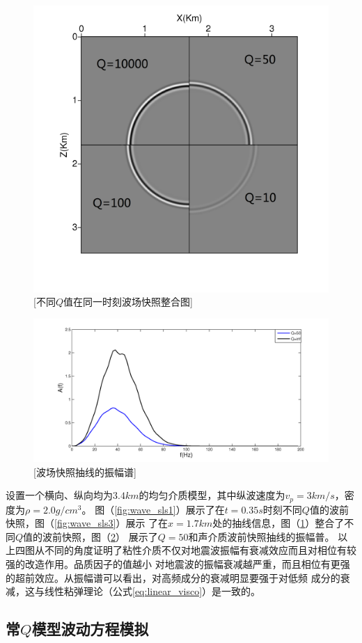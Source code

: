 \begin{figure}[!htbp]
	    \centering
		\includegraphics[width=0.5\linewidth]{figure/wave_sls2}
		[不同$Q$值在同一时刻波场快照整合图]
		\label{fig:wave_sls2}
\end{figure}
\begin{figure}[!htbp]
	    \centering
		\includegraphics[width=0.7\linewidth]{figure/wave_sls4}
		[波场快照抽线的振幅谱]
		\label{fig:wave_sls4}
\end{figure}
设置一个横向、纵向均为$3.4km$的均匀介质模型，其中纵波速度为$v_p=3km/s$，密度为$\rho=2.0g/cm^3$。
图（\ref{fig:wave_sls1}）展示了在$t=0.35s$时刻不同$Q$值的波前快照，图（\ref{fig:wave_sls3}）展示
了在$x=1.7km$处的抽线信息，图（\ref{fig:wave_sls2}）整合了不同$Q$值的波前快照，图（\ref{fig:wave_sls4}）
展示了$Q=50$和声介质波前快照抽线的振幅普。
以上四图从不同的角度证明了粘性介质不仅对地震波振幅有衰减效应而且对相位有较强的改造作用。品质因子的值越小
对地震波的振幅衰减越严重，而且相位有更强的超前效应。从振幅谱可以看出，对高频成分的衰减明显要强于对低频
成分的衰减，这与线性粘弹理论（公式\ref{eq:linear_visco}）是一致的。

\vspace{0.3cm}
\subsection{常$Q$模型波动方程模拟}
\vspace{0.3cm}

